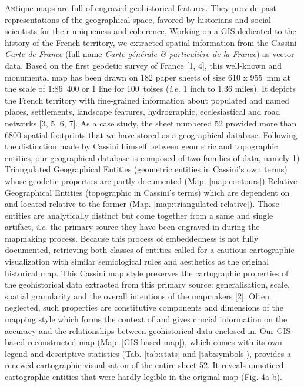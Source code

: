 \documentclass[portrait,a0]{sciposter}
\begin{document}
\begin{minipage}[b]{\textwidth}
\begin{multicols}{3}
    \lettrine{A}ntique maps are full of engraved geohistorical features. They provide past representations of the geographical space, favored by historians and social scientists for their uniqueness and coherence. Working on a GIS dedicated to the history of the French territory, we extracted spatial information from the Cassini \textit{Carte de France} (full name \textit{Carte générale \textsc{\textit{\&}} particulière de la France}) as vector data. Based on the first geodetic survey of France [1, 4], this well-known and monumental map has been drawn on 182 paper sheets of size 610 x 955~mm at the scale of 1:86~400 or 1 line for 100~toises (\textit{i.e.} 1 inch to 1.36 miles). It depicts the French territory with fine-grained information about populated and named places, settlements, landscape features, hydrographic, ecclesiastical and road networks [3, 5, 6, 7]. As a case study, the sheet numbered 52 provided more than \num{6800} spatial footprints that we have stored as a geographical database. Following the distinction made by Cassini himself between \og geometric \fg and \og topographic \fg entities, our geographical database is composed of two families of data, namely 1) Triangulated Geographical Entities (\og geometric \fg entities in Cassini’s own terms) whose geodetic properties are partly documented (Map. \ref{map:contours}) Relative Geographical Entities (\og topographic \fg in Cassini’s terms) which are dependent on and located relative to the former (Map. \ref{map:triangulated-relative}). Those entities are analytically distinct but come together from a same and single artifact, \emph{i.e.} the primary source they have been engraved in during the mapmaking process. Because this process of embeddedness is not fully documented, retrieving both classes of entities called for a cautious cartographic visualization with similar semiological rules and aesthetics as the original historical map. This \og Cassini map style \fg preserves the cartographic properties of the geohistorical data extracted from this primary source: generalisation, scale, spatial granularity and the overall intentions of the mapmakers [2]. Often neglected, such properties are constitutive components and dimensions of the mapping style which forms the context of and gives crucial information on the accuracy and the relationships between geohistorical data enclosed in. Our GIS-based reconstructed map (Map. \ref{GIS-based map}),  which comes with its own legend and descriptive statistics (Tab. \ref{tab:stats} and \ref{tab:symbols}), provides a renewed cartographic visualisation of the entire sheet 52. It reveals unnoticed cartographic entities that were hardly legible in the original map (Fig. 4a-b).\\

\end{multicols}
\end{minipage}
\end{document}
